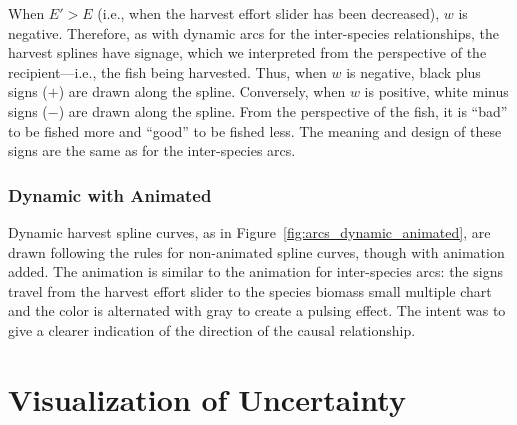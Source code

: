 When $E' > E$ (i.e., when the harvest effort slider has been decreased), $w$ is negative.  Therefore, as with dynamic arcs for the inter-species relationships, the harvest splines have signage, which we interpreted from the perspective of the recipient---i.e., the fish being harvested.  Thus, when $w$ is negative, black plus signs ($+$) are drawn along the spline.  Conversely, when $w$ is positive, white minus signs ($-$) are drawn along the spline.  From the perspective of the fish, it is ``bad'' to be fished more and ``good'' to be fished less.  The meaning and design of these signs are the same as for the inter-species arcs.

\subsubsection{Dynamic with Animated}

Dynamic harvest spline curves, as in Figure~\ref{fig:arcs_dynamic_animated}, are drawn following the rules for non-animated spline curves, though with animation added.  The animation is similar to the animation for inter-species arcs:  the signs travel from the harvest effort slider to the species biomass small multiple chart and the color is alternated with gray to create a pulsing effect.  The intent was to give a clearer indication of the direction of the causal relationship.

\section{Visualization of Uncertainty}






